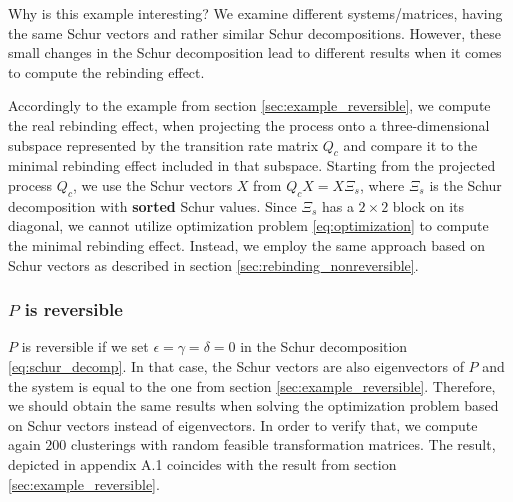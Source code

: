 Why is this example interesting? We examine different systems/matrices, having the same Schur vectors and rather similar Schur decompositions. However, these small changes in the Schur decomposition lead to different results when it comes to compute the rebinding effect.

Accordingly to the example from section \ref{sec:example_reversible}, we compute the real rebinding effect, when projecting the process onto a three-dimensional subspace represented by the transition rate matrix $Q_c$ and compare it to the minimal rebinding effect included in that subspace.
Starting from the projected process $Q_c$, we use the Schur vectors $X$ from $Q_c X = X \Xi_s$, where $\Xi_s$ is the Schur decomposition with \textbf{sorted} Schur values.
Since $\Xi_s$ has a $2 \times 2$ block on its diagonal, we cannot utilize optimization problem \eqref{eq:optimization} to compute the minimal rebinding effect.
Instead, we employ the same approach based on Schur vectors as described in section \ref{sec:rebinding_nonreversible}.

\subsubsection*{$P$ is reversible}

$P$ is reversible if we set $\epsilon = \gamma = \delta = 0$ in the Schur decomposition \eqref{eq:schur_decomp}. In that case, the Schur vectors are also eigenvectors of $P$ and the system is equal to the one from section \ref{sec:example_reversible}. Therefore, we should obtain the same results when solving the optimization problem based on Schur vectors instead of eigenvectors.
In order to verify that, we compute again $200$ clusterings with random feasible transformation matrices. The result, depicted in appendix A.1 coincides with the result from section \ref{sec:example_reversible}.



